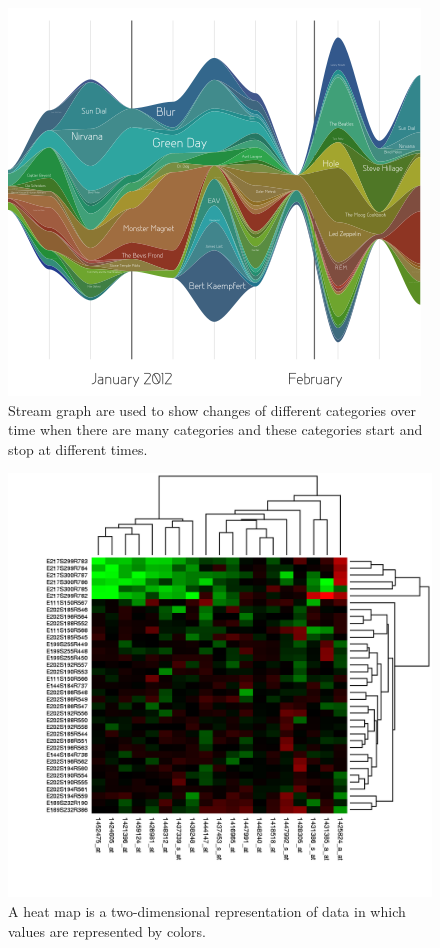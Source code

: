 \begin{figure}[htb]  
      \includegraphics[width=\columnwidth]{images/Streamgraph.png}
      \caption{Stream graph are used to show changes of different categories over time when there are many categories and these categories start and stop at different times.}
\end{figure}

\begin{figure}[htb]
      \includegraphics[width=\columnwidth]{images/Heatmap.png}
      \caption{A heat map is a two-dimensional representation of data in which values are represented by colors.}
\end{figure}


